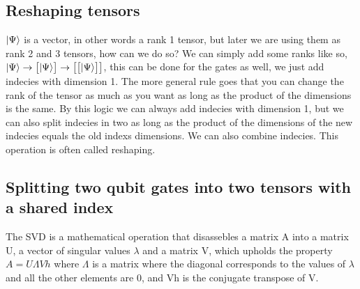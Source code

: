 \subsection{Reshaping tensors }
\noindent 
$\ket{\Psi}$ is a vector, in other words a rank 1 tensor, but later we are using them as rank 2 and 3 tensors, how can we do so? We can simply add some ranks like so,
$\ket{\Psi} \rightarrow
\begin{bmatrix}
    \ket{\Psi}
\end{bmatrix} \rightarrow
\begin{bmatrix}
    \begin{bmatrix}
        \ket{\Psi}
    \end{bmatrix}
\end{bmatrix}$, this can be done for the gates as well, we just add indecies with dimension 1.  
The more general rule goes that you can change the rank of the tensor as much as you want as long as the product of the dimensions is the same. By this logic we can always add indecies with dimension 1, but we can also split indecies in two as long as the product of the dimensions of the new indecies equals the old indexs dimensions. We can also combine indecies. This operation is often called reshaping.  

\subsection{Splitting two qubit gates into two tensors with a shared index }
The SVD\cite{SVD} is a mathematical operation that disassebles a matrix A into a matrix U, a vector of singular values $\lambda$ and a matrix V, which upholds the property $A=U\Lambda Vh$ where $\Lambda$ is a matrix where the diagonal corresponds to the values of $\lambda$ and all the other elements are 0, and Vh is the conjugate transpose of V. 


